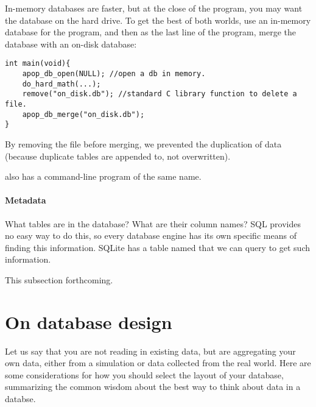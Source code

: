 In-memory databases are faster, but at the close of the program, you
may want the database on the hard drive. To get the best of both
worlds, use an in-memory database for the program, and then as the last
line of the program, merge the database with an on-disk database:
\begin{lstlisting}
int main(void){
    apop_db_open(NULL); //open a db in memory.
    do_hard_math(...);
    remove("on_disk.db"); //standard C library function to delete a file.
    apop_db_merge("on_disk.db");
}
\end{lstlisting}
By removing the file before merging, we prevented the duplication of
data (because duplicate tables are appended to, not overwritten).

 also has a command-line program of the
same name.


\paragraph{Metadata} What tables are in the database? What are their
column names? SQL provides no easy way to do this, so every database
engine has its own specific means of finding this information. SQLite
has a table named  that we can query to get
such information.

This subsection forthcoming.

\section{On database design}
Let us say that you are not reading in existing data, but are
aggregating your own data, either from a simulation or data
collected from the real world. Here are some considerations for how you
should select the layout of your database, summarizing the common wisdom
about the best way to think about data in a databse.

